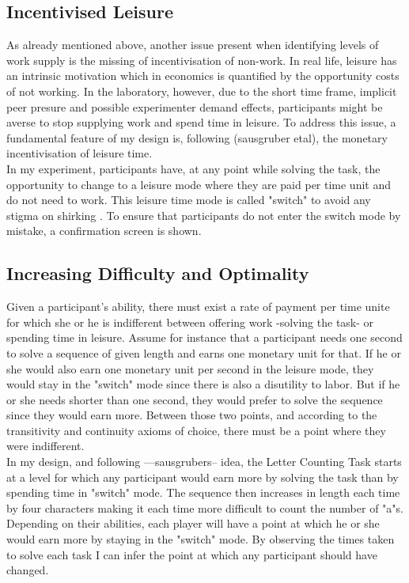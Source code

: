     \subsection{Incentivised Leisure}
    
    As already mentioned above, another issue present when identifying levels of work supply is the missing of incentivisation of non-work. In real life, leisure has an intrinsic motivation which in economics is quantified by the opportunity costs of not working. In the laboratory, however, due to the short time frame, implicit peer presure and possible experimenter demand effects, participants might be averse to stop supplying work and spend time in leisure. To address this issue, a fundamental feature of my design is, following (sausgruber etal), the monetary incentivisation of leisure time.\\
    
    In my experiment, participants have, at any point while solving the task, the opportunity to change to a leisure mode where they are paid per time unit and do not need to work. This leisure time mode is called "switch" to avoid any stigma on shirking \citep{rey-biel2016, eriksson2009}. To ensure that participants do not enter the switch mode by mistake, a confirmation screen is shown.
    
    \subsection{Increasing Difficulty and Optimality}
    
    Given a participant's ability, there must exist a rate of payment per time unite for which she or he is indifferent between offering work -solving the task- or spending time in leisure. Assume for instance that a participant needs one second to solve a sequence of given length and earns one monetary unit for that. If he or she would also earn one monetary unit per second in the leisure mode, they would stay in the "switch" mode since there is also a disutility to labor. But if he or she needs shorter than one second, they would prefer to solve the sequence since they would earn more. Between those two points, and according to the transitivity and continuity axioms of choice, there must be a point where they were indifferent.\\
    
    In my design, and following ---sausgrubers-- idea, the Letter Counting Task starts at a level for which any participant would earn more by solving the task than by spending time in "switch" mode. The sequence then increases in length each time by four characters making it each time more difficult to count the number of "a"s. Depending on their abilities, each player will have a point at which he or she would earn more by staying in the "switch" mode. By observing the times taken to solve each task I can infer the point at which any participant should have changed.\\
    
